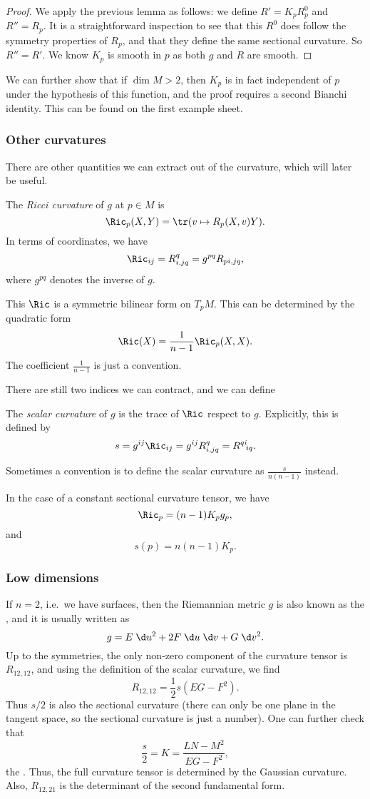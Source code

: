 \documentclass[a4paper]{article}
\begin{document}
\begin{proof}
  We apply the previous lemma as follows: we define $R' = K_p R_p^0$ and $R'' = R_p$. It is a straightforward inspection to see that this $R^0$ does follow the symmetry properties of $R_p$, and that they define the same sectional curvature. So $R'' = R'$. We know $K_p$ is smooth in $p$ as both $g$ and $R$ are smooth.
\end{proof}
We can further show that if $\dim M > 2$, then $K_p$ is in fact independent of $p$ under the hypothesis of this function, and the proof requires a second Bianchi identity. This can be found on the first example sheet.

\subsubsection*{Other curvatures}
There are other quantities we can extract out of the curvature, which will later be useful.
\begin{defi}
  The \emph{Ricci curvature} of $g$ at $p \in M$ is
  \[
    \Ric_p(X, Y) = \tr(v \mapsto R_p(X, v) Y).
  \]
  In terms of coordinates, we have
  \[
    \Ric_{ij} = R^q_{i,jq} = g^{pq} R_{pi, jq},
  \]
  where $g^{pq}$ denotes the inverse of $g$.

  This $\Ric$ is a symmetric bilinear form on $T_p M$. This can be determined by the quadratic form
  \[
    \Ric(X) = \frac{1}{n - 1} \Ric_p(X, X).
  \]
  The coefficient $\frac{1}{n - 1}$ is just a convention.
\end{defi}
There are still two indices we can contract, and we can define
\begin{defi}
  The \emph{scalar curvature} of $g$ is the trace of $\Ric$ respect to $g$. Explicitly, this is defined by
  \[
    s = g^{ij}\Ric_{ij} = g^{ij} R^q_{i, jq} = R^{qi}\!_{iq}.
  \]
\end{defi}
Sometimes a convention is to define the scalar curvature as $\frac{s}{n(n - 1)}$ instead.

In the case of a constant sectional curvature tensor, we have
\[
  \Ric_p = (n - 1) K_p g_p,
\]
and
\[
  s(p) = n(n - 1) K_p.
\]

\subsubsection*{Low dimensions}
If $n = 2$, i.e.\ we have surfaces, then the Riemannian metric $g$ is also known as the , and it is usually written as
\[
  g = E\;\d u^2 + 2 F \;\d u\;\d v + G \;\d v^2.
\]
Up to the symmetries, the only non-zero component of the curvature tensor is $R_{12, 12}$, and using the definition of the scalar curvature, we find
\[
  R_{12,12} = \frac{1}{2} s (EG - F^2).
\]
Thus $s/2$ is also the sectional curvature (there can only be one plane in the tangent space, so the sectional curvature is just a number). One can further check that
\[
  \frac{s}{2} = K = \frac{LN - M^2}{EG - F^2},
\]
the . Thus, the full curvature tensor is determined by the Gaussian curvature. Also, $R_{12, 21}$ is the determinant of the second fundamental form.
\end{document}
